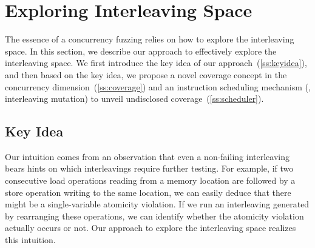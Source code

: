 \section{Exploring Interleaving Space}
\label{s:design}

\newcommand{\segment}{segment graph\xspace}
\newcommand{\segments}{segment graphs\xspace}
\newcommand{\Segments}{Segment graphs\xspace}

\newcommand{\mutable}{mutable edge\xspace}
\newcommand{\mutables}{mutable edges\xspace}
\newcommand{\immutable}{immutable edge\xspace}
\newcommand{\immutables}{immutable edges\xspace}


The essence of a concurrency fuzzing relies on how to explore the
interleaving space.
%
In this section, we describe our approach to effectively explore the
interleaving space.
%
We first introduce the key idea of our
approach~(\autoref{ss:keyidea}), and then based on the key idea, we
propose a novel coverage concept in the concurrency
dimension~(\autoref{ss:coverage}) and an instruction scheduling
mechanism (\ie, interleaving mutation) to unveil undisclosed
coverage~(\autoref{ss:scheduler}).

\subsection{Key Idea}
\label{ss:keyidea}





Our intuition comes from an observation that even a non-failing
interleaving bears hints on which interleavings require further
testing.
%
For example, if two consecutive load operations reading from a memory
location are followed by a store operation writing to the same
location, we can easily deduce that there might be a single-variable
atomicity violation.
%
If we run an interleaving generated by rearranging these operations,
we can identify whether the atomicity violation actually occurs or
not.
%
Our approach to explore the interleaving space realizes this
intuition.


